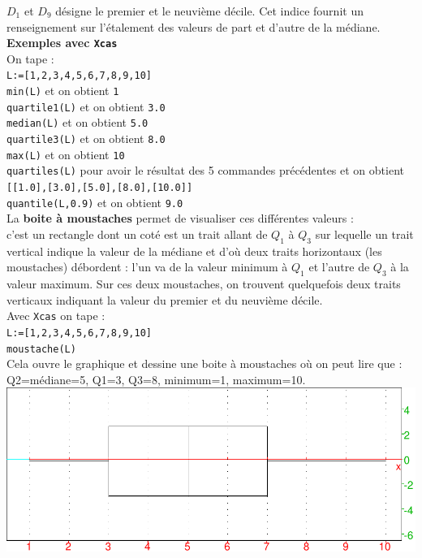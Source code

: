 \documentclass[a4paper,11pt]{book}
\begin{document}
$D_1$ et $D_9$ d\'esigne le premier et le neuvi\`eme d\'ecile. Cet indice 
fournit un renseignement sur l'\'etalement des valeurs de part et 
d'autre de la m\'ediane.\\
{\bf Exemples avec {\tt Xcas}}\\
On tape :\\
{\tt L:=[1,2,3,4,5,6,7,8,9,10]}\\
{\tt min(L)} et on obtient {\tt 1 }\\
{\tt  quartile1(L)} et on obtient {\tt 3.0 }\\
{\tt median(L)} et on obtient {\tt 5.0}\\
{\tt  quartile3(L)} et on obtient {\tt 8.0 }\\
{\tt max(L)} et on obtient {\tt 10 }\\
{\tt quartiles(L)} pour avoir le r\'esultat des 5 commandes pr\'ec\'edentes 
 et on obtient {\tt [[1.0],[3.0],[5.0],[8.0],[10.0]]}\\
{\tt quantile(L,0.9)} et on obtient {\tt 9.0}\\
La {\bf boite \`a moustaches} 
permet de visualiser ces diff\'erentes valeurs :\\
c'est un rectangle dont un cot\'e est un trait allant de $Q_1$ \`a $Q_3$ sur 
lequelle un trait vertical indique la valeur de la m\'ediane et d'o\`u
deux traits horizontaux (les moustaches) d\'ebordent : l'un  va de la valeur 
minimum \`a $Q_1$ et l'autre de $Q_3$ \`a la valeur maximum. 
Sur ces deux moustaches, on trouvent quelquefois deux traits verticaux 
indiquant la valeur du premier et du neuvi\`eme d\'ecile.\\
Avec {\tt Xcas} on tape :\\
{\tt L:=[1,2,3,4,5,6,7,8,9,10]}\\
{\tt moustache(L)}\\
Cela ouvre le graphique et dessine une boite \`a moustaches o\`u on peut 
lire que :\\
Q2=m\'ediane=5, Q1=3, Q3=8, minimum=1, maximum=10.\\

\includegraphics[width=\textwidth]{moustache}
\end{document}
